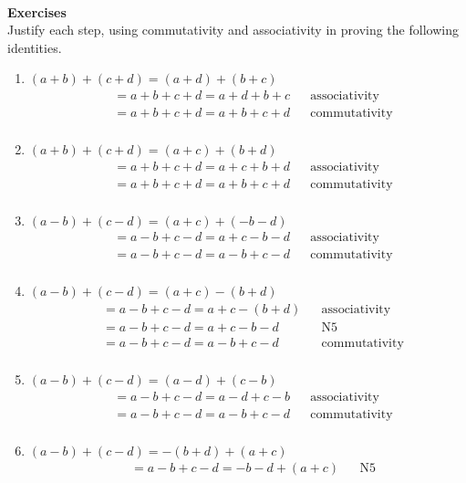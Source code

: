 \documentclass{article}
\begin{document}
\newpage
\leavevmode \\
\textbf{Exercises}\\
Justify each step, using commutativity and associativity in proving the following identities. \\
\begin{enumerate}
\item $(a + b) + (c + d) = (a + d) + (b + c)$
	\begin{align*}
	 &= a + b + c + d = a + d + b + c	&&\text{associativity} \\
	 &= a + b + c + d = a + b + c + d	&&\text{commutativity} \\
	\end{align*}
\item $(a + b) + (c + d) = (a + c) + (b + d)$
	\begin{align*}
	 &= a + b + c + d = a + c + b + d	&&\text{associativity} \\
	 &= a + b + c + d = a + b + c + d	&&\text{commutativity} \\
	\end{align*}
\item $(a - b) + (c - d) = (a + c) + ( -b - d)$
	\begin{align*}
	 &= a - b + c - d = a + c - b - d	&&\text{associativity} \\
	 &= a - b + c - d = a - b + c - d	&&\text{commutativity} \\
	\end{align*}
\item $(a - b) + (c - d) = (a + c) - (b + d)$
	\begin{align*}
	 &= a - b + c - d = a + c - (b + d)	&&\text{associativity} \\
	 &= a - b + c - d = a + c - b - d	&&\text{N5} \\
	 &= a - b + c - d = a - b + c - d	&&\text{commutativity} \\
	\end{align*}
\item $(a - b) + (c - d) = (a - d) + (c - b)$
	\begin{align*}
	 &= a - b + c - d = a - d + c - b	&&\text{associativity} \\
	 &= a - b + c - d = a - b + c - d	&&\text{commutativity} \\
	\end{align*}
\item $(a - b) + (c - d) = -(b + d) + (a + c)$
	\begin{align*}
	 &= a - b + c - d = -b - d + (a + c)	&&\text{N5} \\

\end{align*}
\end{enumerate}
\end{document}
